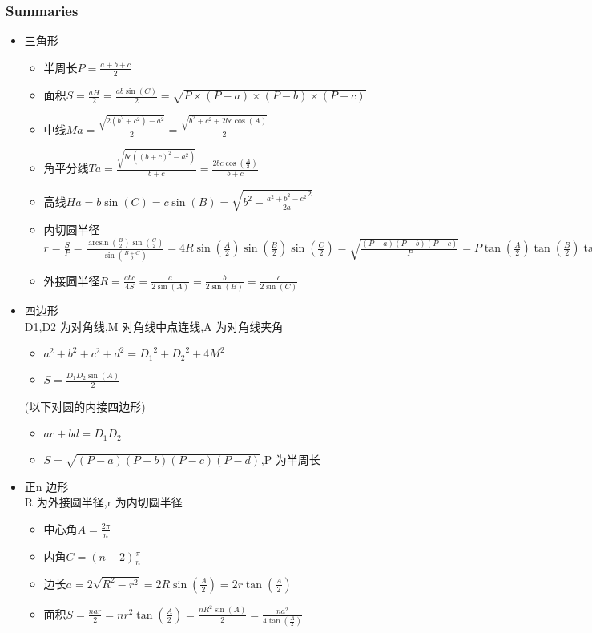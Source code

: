 \subsubsection{Summaries}
\begin{itemize}
\item 三角形
\begin{itemize}
\item 半周长$P=\frac{a+b+c}{2}$
\item 面积$S=\frac{aH}{2}=\frac{ab\sin(C)}{2}=\sqrt{P\times (P-a)\times (P-b)\times (P-c)}$
\item 中线$Ma=\frac{\sqrt{2(b^2+c^2)-a^2}}{2}=\frac{\sqrt{b^2+c^2+2bc\cos(A)}}{2}$
\item 角平分线$Ta=\frac{\sqrt{bc((b+c)^2-a^2)}}{b+c}=\frac{2bc\cos(\frac{A}{2})}{b+c}$
\item 高线$Ha=b\sin(C)=c\sin(B)=\sqrt{b^2-{\frac{a^2+b^2-c^2}{2a}}^2}$
\item 内切圆半径$r=\frac{S}{P}=\frac{\arcsin(\frac{B}{2})\sin(\frac{C}{2})}{\sin(\frac{B+C}{2})}=4R\sin(\frac{A}{2})\sin(\frac{B}{2})\sin(\frac{C}{2})=\sqrt{\frac{(P-a)(P-b)(P-c)}{P}}=P\tan(\frac{A}{2})\tan(\frac{B}{2})\tan(\frac{C}{2})$
\item 外接圆半径$R=\frac{abc}{4S}=\frac{a}{2\sin(A)}=\frac{b}{2\sin(B)}=\frac{c}{2\sin(C)}$
\end{itemize}
\item 四边形\\
D1,D2 为对角线,M 对角线中点连线,A 为对角线夹角
\begin{itemize}
\item $a^2+b^2+c^2+d^2={D_1}^2+{D_2}^2+4M^2$
\item $S=\frac{D_1D_2\sin(A)}{2}$
\end{itemize}
(以下对圆的内接四边形)
\begin{itemize}
\item $ac+bd=D_1D_2$
\item $S=\sqrt{(P-a)(P-b)(P-c)(P-d)}$,P 为半周长
\end{itemize}
\item 正n 边形\\
R 为外接圆半径,r 为内切圆半径
\begin{itemize}
\item 中心角$A=\frac{2\pi}{n}$
\item 内角$C=(n-2)\frac{\pi}{n}$
\item 边长$a=2\sqrt{R^2-r^2}=2R\sin(\frac{A}{2})=2r\tan(\frac{A}{2})$
\item 面积$S=\frac{nar}{2}=nr^2\tan(\frac{A}{2})=\frac{nR^2\sin(A)}{2}=\frac{na^2}{4\tan(\frac{A}{2})}$

\end{itemize}
\end{itemize}
